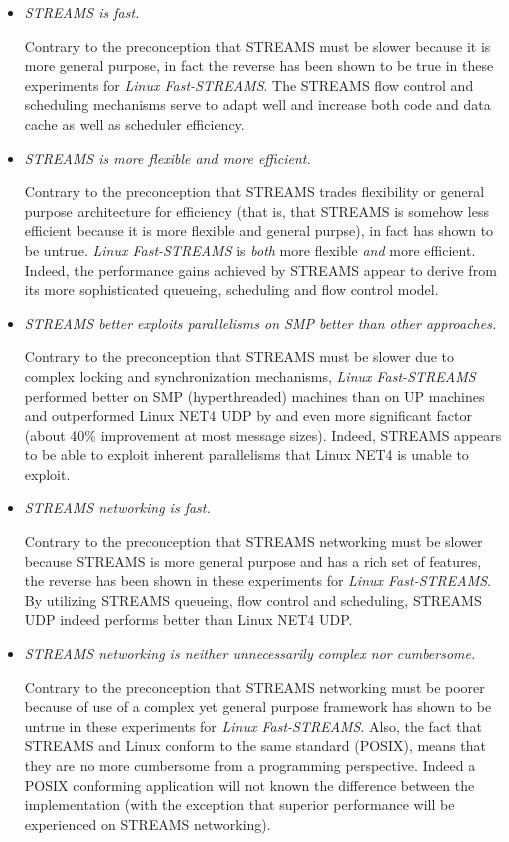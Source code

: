 \documentclass[letterpaper,final,notitlepage,twocolumn,10pt,twoside]{article}
\begin{document}
\begin{itemize}

\item \textit{STREAMS is fast.}

Contrary to the preconception that STREAMS must be slower because it is more
general purpose, in fact the reverse has been shown to be true in these
experiments for \textsl{Linux Fast-STREAMS}.  The STREAMS flow control and
scheduling mechanisms serve to adapt well and increase both code and data
cache as well as scheduler efficiency.

\item \textit{STREAMS is more flexible {\em and} more efficient.}

Contrary to the preconception that STREAMS trades flexibility or general
purpose architecture for efficiency (that is, that STREAMS is somehow less
efficient because it is more flexible and general purpse), in fact has shown
to be untrue.  \textsl{Linux Fast-STREAMS} is {\em both} more flexible {\em
and} more efficient.  Indeed, the performance gains achieved by  STREAMS
appear to derive from its more sophisticated queueing, scheduling and flow
control model.

\item \textit{STREAMS better exploits parallelisms on SMP better than other approaches.}

Contrary to the preconception that STREAMS must be slower due to complex
locking and synchronization mechanisms, \textsl{Linux Fast-STREAMS} performed
better on SMP (hyperthreaded) machines than on UP machines and outperformed
Linux NET4 UDP by and even more significant factor (about 40\% improvement at
most message sizes).  Indeed, STREAMS appears to be able to exploit inherent
parallelisms that Linux NET4 is unable to exploit.

\item \textit{STREAMS networking is fast.}

Contrary to the preconception that STREAMS networking must be slower because
STREAMS is more general purpose and has a rich set of features, the reverse
has been shown in these experiments for \textsl{Linux Fast-STREAMS}.  By
utilizing STREAMS queueing, flow control and scheduling, STREAMS UDP indeed
performs better than Linux NET4 UDP.

\item \textit{STREAMS networking is neither unnecessarily complex nor cumbersome.}

Contrary to the preconception that STREAMS networking must be poorer because
of use of a complex yet general purpose framework has shown to be untrue in
these experiments for \textsl{Linux Fast-STREAMS}.  Also, the fact that
STREAMS and Linux conform to the same standard (POSIX), means that they are no
more cumbersome from a programming perspective.  Indeed a POSIX conforming
application will not known the difference between the implementation (with the
exception that superior performance will be experienced on STREAMS
networking).

\end{itemize}
\end{document}
